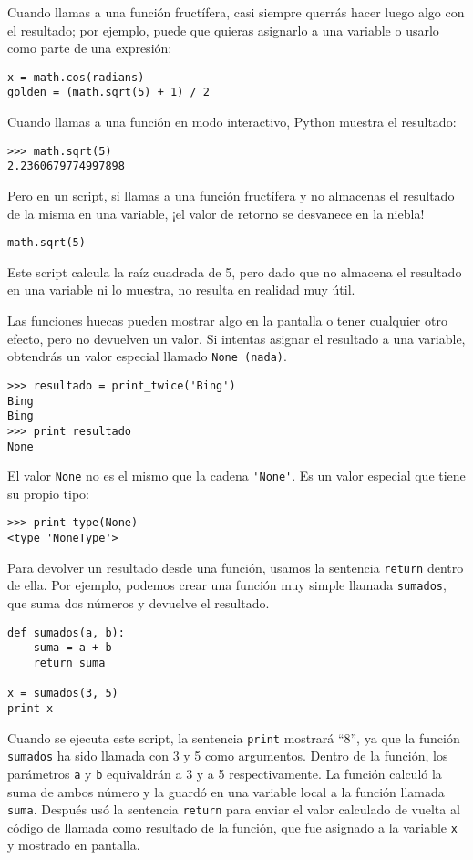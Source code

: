 Cuando llamas a una función fructífera, casi siempre
querrás hacer luego algo con el resultado; por ejemplo, puede
que quieras asignarlo a una variable o usarlo como parte de una expresión:

\beforeverb
\begin{verbatim}
x = math.cos(radians)
golden = (math.sqrt(5) + 1) / 2
\end{verbatim}
\afterverb
%
Cuando llamas a una función en modo interactivo, Python muestra
el resultado:

\beforeverb
\begin{verbatim}
>>> math.sqrt(5)
2.2360679774997898
\end{verbatim}
\afterverb
%
Pero en un script, si llamas a una función fructífera y no
almacenas el resultado de la misma en una variable,
¡el valor de retorno se desvanece en la niebla!

\beforeverb
\begin{verbatim}
math.sqrt(5)
\end{verbatim}
\afterverb
%
Este script calcula la raíz cuadrada de 5, pero dado que no almacena
el resultado en una variable ni lo muestra, no resulta en realidad muy útil.


Las funciones huecas pueden mostrar algo en la pantalla o tener cualquier
otro efecto, pero no devuelven un valor. Si intentas asignar
el resultado a una variable, obtendrás un valor especial llamado
{\tt None (nada)}.


\beforeverb
\begin{verbatim}
>>> resultado = print_twice('Bing')
Bing
Bing
>>> print resultado
None
\end{verbatim}
\afterverb
%
El valor {\tt None} no es el mismo que la cadena \verb"'None'".
Es un valor especial que tiene su propio tipo:

\beforeverb
\begin{verbatim}
>>> print type(None)
<type 'NoneType'>
\end{verbatim}
\afterverb
%
Para devolver un resultado desde una función, usamos la sentencia {\tt return}
dentro de ella. Por ejemplo, podemos crear una función
muy simple llamada {\tt sumados},
que suma dos números y devuelve el resultado.

\beforeverb
\begin{verbatim}
def sumados(a, b):
    suma = a + b
    return suma

x = sumados(3, 5)
print x
\end{verbatim}
\afterverb
%
Cuando se ejecuta este script, la sentencia {\tt print} mostrará ``8'',
ya que la función {\tt sumados} ha sido llamada con 3 y 5 como argumentos.
Dentro de la función, los parámetros {\tt a} y {\tt b} equivaldrán a 3 y a 5
respectivamente. La función calculó la suma de ambos número y la guardó
en una variable local a la función llamada {\tt suma}.
Después usó la sentencia {\tt return}
para enviar el valor calculado de vuelta al código de llamada
como resultado de la función, que fue asignado
a la variable {\tt x} y mostrado en pantalla.


